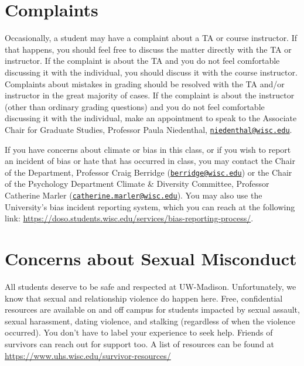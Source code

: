 \documentclass[11pt,man]{article}
\begin{document}
\hypertarget{complaints}{%
\section{Complaints}\label{complaints}}

Occasionally, a student may have a complaint about a TA or course
instructor. If that happens, you should feel free to discuss the matter
directly with the TA or instructor. If the complaint is about the TA and
you do not feel comfortable discussing it with the individual, you
should discuss it with the course instructor. Complaints about mistakes
in grading should be resolved with the TA and/or instructor in the great
majority of cases. If the complaint is about the instructor (other than
ordinary grading questions) and you do not feel comfortable discussing
it with the individual, make an appointment to speak to the Associate
Chair for Graduate Studies, Professor Paula Niedenthal,
\href{mailto:niedenthal@wisc.edu}{\nolinkurl{niedenthal@wisc.edu}}.

If you have concerns about climate or bias in this class, or if you wish
to report an incident of bias or hate that has occurred in class, you
may contact the Chair of the Department, Professor Craig Berridge
(\href{mailto:berridge@wisc.edu}{\nolinkurl{berridge@wisc.edu}}) or the
Chair of the Psychology Department Climate \& Diversity Committee,
Professor Catherine Marler
(\href{mailto:catherine.marler@wisc.edu}{\nolinkurl{catherine.marler@wisc.edu}}).
You may also use the University's bias incident reporting system, which
you can reach at the following link:
\url{https://doso.students.wisc.edu/services/bias-reporting-process/}.

\hypertarget{concerns-about-sexual-misconduct}{%
\section{Concerns about Sexual
Misconduct}\label{concerns-about-sexual-misconduct}}

All students deserve to be safe and respected at UW-Madison.
Unfortunately, we know that sexual and relationship violence do happen
here. Free, confidential resources are available on and off campus for
students impacted by sexual assault, sexual harassment, dating violence,
and stalking (regardless of when the violence occurred). You don't have
to label your experience to seek help. Friends of survivors can reach
out for support too. A list of resources can be found at
\url{https://www.uhs.wisc.edu/survivor-resources/}
\end{document}
